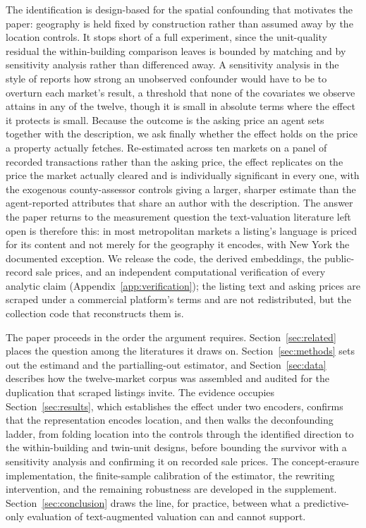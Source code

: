 \documentclass{article}
\begin{document}
The identification is design-based for the spatial confounding that motivates the paper: geography is held fixed by construction rather than assumed away by the location controls. It stops short of a full experiment, since the unit-quality residual the within-building comparison leaves is bounded by matching and by sensitivity analysis rather than differenced away. A sensitivity analysis in the style of \citet{cinelli2020making} reports how strong an unobserved confounder would have to be to overturn each market's result, a threshold that none of the covariates we observe attains in any of the twelve, though it is small in absolute terms where the effect it protects is small. Because the outcome is the asking price an agent sets together with the description, we ask finally whether the effect holds on the price a property actually fetches. Re-estimated across ten markets on a panel of recorded transactions rather than the asking price, the effect replicates on the price the market actually cleared and is individually significant in every one, with the exogenous county-assessor controls giving a larger, sharper estimate than the agent-reported attributes that share an author with the description. The answer the paper returns to the measurement question the text-valuation literature left open is therefore this: in most metropolitan markets a listing's language is priced for its content and not merely for the geography it encodes, with New York the documented exception. We release the code, the derived embeddings, the public-record sale prices, and an independent computational verification of every analytic claim (Appendix~\ref{app:verification}); the listing text and asking prices are scraped under a commercial platform's terms and are not redistributed, but the collection code that reconstructs them is.

The paper proceeds in the order the argument requires. Section~\ref{sec:related} places the question among the literatures it draws on. Section~\ref{sec:methods} sets out the estimand and the partialling-out estimator, and Section~\ref{sec:data} describes how the twelve-market corpus was assembled and audited for the duplication that scraped listings invite. The evidence occupies Section~\ref{sec:results}, which establishes the effect under two encoders, confirms that the representation encodes location, and then walks the deconfounding ladder, from folding location into the controls through the identified direction to the within-building and twin-unit designs, before bounding the survivor with a sensitivity analysis and confirming it on recorded sale prices. The concept-erasure implementation, the finite-sample calibration of the estimator, the rewriting intervention, and the remaining robustness are developed in the supplement. Section~\ref{sec:conclusion} draws the line, for practice, between what a predictive-only evaluation of text-augmented valuation can and cannot support.
\end{document}
